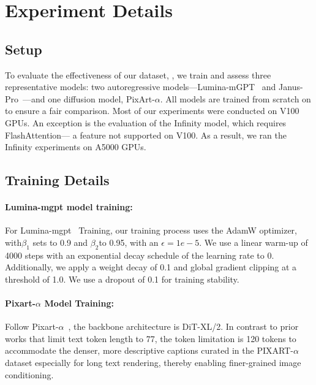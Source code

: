 \newpage

\appendix
\startcontents[app]


\section{Experiment Details}

\subsection{Setup}
To evaluate the effectiveness of our dataset, \DatasetName, we train and assess three representative models: two autoregressive models—Lumina-mGPT~\cite{lumina_mgpt} and Janus-Pro~\cite{januspro}—and one diffusion model, PixArt-$\alpha$. 
All models are trained from scratch on \DatasetName to ensure a fair comparison.
Most of our experiments were conducted on V100 GPUs. 
An exception is the evaluation of the Infinity model, which requires FlashAttention— a feature not supported on V100. As a result, we ran the Infinity experiments on A5000 GPUs.



\subsection{Training Details}
\paragraph{Lumina-mgpt model training:}
For Lumina-mgpt~\cite{lumina_mgpt} Training, our training process uses the AdamW optimizer, with$\beta_1$ sets to 0.9 and $\beta_2$to 0.95, with an $\epsilon=1e-5$. 
We use a linear warm-up of 4000 steps with an exponential decay schedule of the learning rate to 0. 
Additionally, we apply a weight decay of 0.1 and global gradient clipping at a threshold of 1.0. We use a dropout of 0.1 for training stability.


\paragraph{Pixart-$\alpha$ Model Training:}
Follow Pixart-$\alpha$~\cite{pixarta}, the backbone architecture is DiT-XL/2. 
In contrast to prior works that limit text token length to 77, the token limitation is 120 tokens to accommodate the denser, more descriptive captions curated in the PIXART-$\alpha$ dataset especially for long text rendering, thereby enabling finer-grained image conditioning.

